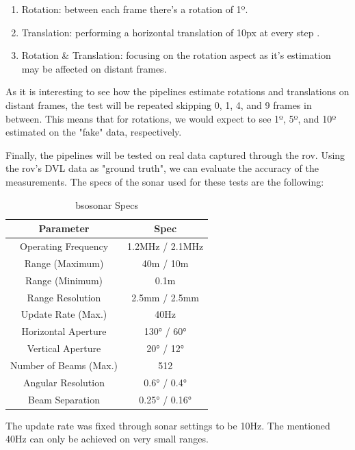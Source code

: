 \begin{enumerate}
    \item Rotation: between each frame there's a rotation of 1º.
    \item Translation: performing a horizontal translation of 10px at every step .
    \item Rotation \& Translation: focusing on the rotation aspect as it's estimation may be affected on distant frames.
\end{enumerate}


As it is interesting to see how the pipelines estimate rotations and translations on distant frames, the test will be repeated skipping 0, 1, 4, and 9 frames in between. This means that for rotations, we would expect to see 1º, 5º, and 10º estimated on the "fake" data, respectively. 

Finally, the pipelines will be tested on real data captured through the \acrshort{rov}. Using the \acrshort{rov}'s DVL data as "ground truth", we can evaluate the accuracy of the measurements. The specs of the sonar used for these tests are the following:


\begin{table}
    \centering
    \begin{tabular}{|c|c|}
        \hline
        \textbf{Parameter} & \textbf{Spec} \\ \hline
        Operating Frequency & 1.2MHz / 2.1MHz \\ \hline
        Range (Maximum) & 40m / 10m \\ \hline
        Range (Minimum) & 0.1m \\ \hline
        Range Resolution & 2.5mm / 2.5mm \\ \hline
        Update Rate (Max.) & 40Hz \\ \hline
        Horizontal Aperture & 130° / 60° \\ \hline
        Vertical Aperture & 20° / 12° \\ \hline
        Number of Beams (Max.) & 512 \\ \hline
        Angular Resolution & 0.6° / 0.4° \\ \hline
        Beam Separation & 0.25° / 0.16° \\ \hline
    \end{tabular}
    \caption{\acrlong{bsosonar} Specs}
    \label{tab:sonar_specs}
\end{table}

The update rate was fixed through sonar settings to be 10Hz. The mentioned 40Hz can only be achieved on very small ranges. 


